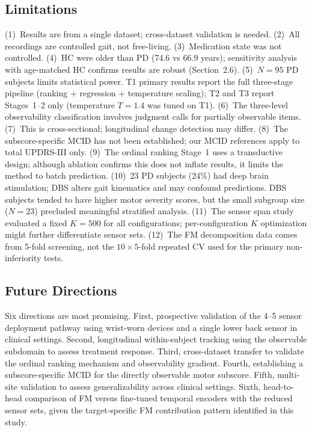 \documentclass[11pt,a4paper]{article}
\begin{document}
\subsection{Limitations}

(1)~Results are from a single dataset; cross-dataset validation is needed. (2)~All recordings are controlled gait, not free-living. (3)~Medication state was not controlled. (4)~HC were older than PD (74.6 vs 66.9 years); sensitivity analysis with age-matched HC confirms results are robust (Section~2.6). (5)~$N=95$ PD subjects limits statistical power. T1 primary results report the full three-stage pipeline (ranking + regression + temperature scaling); T2 and T3 report Stages~1--2 only (temperature $T=1.4$ was tuned on T1). (6)~The three-level observability classification involves judgment calls for partially observable items. (7)~This is cross-sectional; longitudinal change detection may differ. (8)~The subscore-specific MCID has not been established; our MCID references apply to total UPDRS-III only. (9)~The ordinal ranking Stage~1 uses a transductive design; although ablation confirms this does not inflate results, it limits the method to batch prediction. (10)~23 PD subjects (24\%) had deep brain stimulation; DBS alters gait kinematics and may confound predictions. DBS subjects tended to have higher motor severity scores, but the small subgroup size ($N=23$) precluded meaningful stratified analysis. (11)~The sensor span study evaluated a fixed $K=500$ for all configurations; per-configuration $K$ optimization might further differentiate sensor sets. (12)~The FM decomposition data comes from 5-fold screening, not the $10\times 5$-fold repeated CV used for the primary non-inferiority tests.

\subsection{Future Directions}

Six directions are most promising. First, prospective validation of the 4--5 sensor deployment pathway using wrist-worn devices and a single lower back sensor in clinical settings. Second, longitudinal within-subject tracking using the observable subdomain to assess treatment response. Third, cross-dataset transfer to validate the ordinal ranking mechanism and observability gradient. Fourth, establishing a subscore-specific MCID for the directly observable motor subscore. Fifth, multi-site validation to assess generalizability across clinical settings. Sixth, head-to-head comparison of FM versus fine-tuned temporal encoders with the reduced sensor sets, given the target-specific FM contribution pattern identified in this study.
\end{document}
